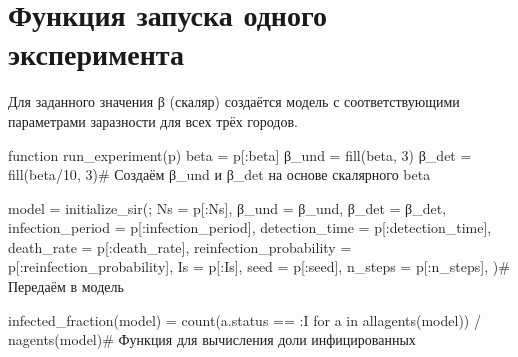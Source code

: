 \documentclass[
  12pt,
  a4paper,
  DIV=11,
  numbers=noendperiod]{scrreprt}
\newenvironment{Shaded}{\begin{snugshade}}{\end{snugshade}}
\newcommand{\CommentTok}[1]{\textcolor[rgb]{0.37,0.37,0.37}{#1}}
\newcommand{\ControlFlowTok}[1]{\textcolor[rgb]{0.00,0.23,0.31}{#1}}
\newcommand{\FloatTok}[1]{\textcolor[rgb]{0.68,0.00,0.00}{#1}}
\newcommand{\FunctionTok}[1]{\textcolor[rgb]{0.28,0.35,0.67}{#1}}
\newcommand{\KeywordTok}[1]{\textcolor[rgb]{0.00,0.23,0.31}{#1}}
\newcommand{\NormalTok}[1]{\textcolor[rgb]{0.00,0.23,0.31}{#1}}
\newcommand{\OperatorTok}[1]{\textcolor[rgb]{0.37,0.37,0.37}{#1}}
\begin{document}
\section{Функция запуска одного
эксперимента}\label{ux444ux443ux43dux43aux446ux438ux44f-ux437ux430ux43fux443ux441ux43aux430-ux43eux434ux43dux43eux433ux43e-ux44dux43aux441ux43fux435ux440ux438ux43cux435ux43dux442ux430}

Для заданного значения β (скаляр) создаётся модель с соответствующими
параметрами заразности для всех трёх городов.

\begin{Shaded}
\begin{Highlighting}[]
\KeywordTok{function} \FunctionTok{run\_experiment}\NormalTok{(p)}
\NormalTok{    beta }\OperatorTok{=}\NormalTok{ p[}\OperatorTok{:}\NormalTok{beta]}
\NormalTok{    β\_und }\OperatorTok{=} \FunctionTok{fill}\NormalTok{(beta, }\FloatTok{3}\NormalTok{)}
\NormalTok{    β\_det }\OperatorTok{=} \FunctionTok{fill}\NormalTok{(beta}\OperatorTok{/}\FloatTok{10}\NormalTok{, }\FloatTok{3}\NormalTok{)}\CommentTok{\# Создаём β\_und и β\_det на основе скалярного beta}

\NormalTok{    model }\OperatorTok{=} \FunctionTok{initialize\_sir}\NormalTok{(;}
\NormalTok{        Ns }\OperatorTok{=}\NormalTok{ p[}\OperatorTok{:}\NormalTok{Ns],}
\NormalTok{        β\_und }\OperatorTok{=}\NormalTok{ β\_und,}
\NormalTok{        β\_det }\OperatorTok{=}\NormalTok{ β\_det,}
\NormalTok{        infection\_period }\OperatorTok{=}\NormalTok{ p[}\OperatorTok{:}\NormalTok{infection\_period],}
\NormalTok{        detection\_time }\OperatorTok{=}\NormalTok{ p[}\OperatorTok{:}\NormalTok{detection\_time],}
\NormalTok{        death\_rate }\OperatorTok{=}\NormalTok{ p[}\OperatorTok{:}\NormalTok{death\_rate],}
\NormalTok{        reinfection\_probability }\OperatorTok{=}\NormalTok{ p[}\OperatorTok{:}\NormalTok{reinfection\_probability],}
\NormalTok{        Is }\OperatorTok{=}\NormalTok{ p[}\OperatorTok{:}\NormalTok{Is],}
\NormalTok{        seed }\OperatorTok{=}\NormalTok{ p[}\OperatorTok{:}\NormalTok{seed],}
\NormalTok{        n\_steps }\OperatorTok{=}\NormalTok{ p[}\OperatorTok{:}\NormalTok{n\_steps],}
\NormalTok{    )}\CommentTok{\# Передаём в модель}

    \FunctionTok{infected\_fraction}\NormalTok{(model) }\OperatorTok{=}
        \FunctionTok{count}\NormalTok{(a.status }\OperatorTok{==} \OperatorTok{:}\NormalTok{I }\ControlFlowTok{for}\NormalTok{ a }\KeywordTok{in} \FunctionTok{allagents}\NormalTok{(model)) }\OperatorTok{/} \FunctionTok{nagents}\NormalTok{(model)}\CommentTok{\# Функция для вычисления доли инфицированных}


\end{Highlighting}
\end{Shaded}
\end{document}
